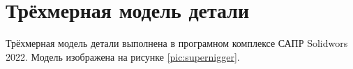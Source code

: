 \section{Трёхмерная модель детали}

Трёхмерная модель детали выполнена в програмном комплексе САПР Solidwors 2022.
Модель изображена на рисунке \ref{pic:supernigger}.





